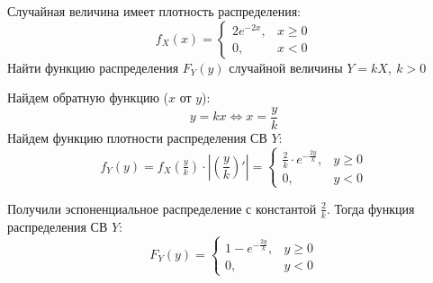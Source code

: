\begin{problem}
Случайная величина имеет плотность распределения:
\[
    f_X(x) = \begin{cases}
        2e^{-2x}, & x \geqslant 0 \\
        0,        & x < 0
    \end{cases}
\]
Найти функцию распределения \(F_Y(y)\) случайной величины \( Y = kX, \ k > 0 \)
\end{problem}
\begin{solution}
    Найдем обратную функцию (\(x\) от \(y\)):
    \[
        y = kx \Longleftrightarrow x = \frac{y}{k}
    \]
    Найдем функцию плотности распределения СВ \(Y\):
    \[
        f_Y(y) = f_X\left(\tfrac{y}{k}\right) \cdot \left| \left(\frac{y}{k}\right)' \right| = \begin{cases}
            \frac{2}{k} \cdot e^{-\frac{2y}{k}}, & y \geqslant 0 \\
            0,                                  & y < 0
        \end{cases}
    \]

    Получили эспоненциальное распределение с константой \(\frac{2}{k} \). Тогда функция распределения СВ \(Y\):
    \[
        F_Y(y) = \begin{cases}
            1 - e^{-\frac{2y}{k}}, & y \geqslant 0 \\
            0,                      & y < 0
        \end{cases}
    \]
\end{solution}